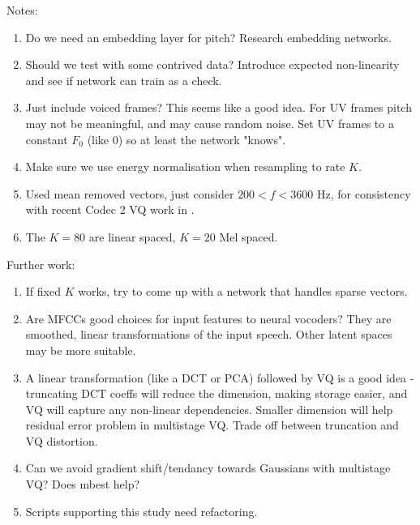 \documentclass{article}
\begin{document}
Notes:
\begin{enumerate}
\item Do we need an embedding layer for pitch?  Research embedding networks.
\item Should we test with some contrived data?  Introduce expected non-linearity and see if network can train as a check.
\item Just include voiced frames?  This seems like a good idea.  For UV frames pitch may not be meaningful, and may cause random noise. Set UV frames to a constant $F_0$ (like 0) so at least the network "knows".
\item Make sure we use energy normalisation \cite{rowe2023_ratek_study} when resampling to rate $K$.
\item Used mean removed vectors, just consider $200 < f < 3600$ Hz, for consistency with recent Codec 2 VQ work in \cite{rowe2023_ratek_study}.
\item The $K=80$ are linear spaced, $K=20$ Mel spaced.
\end{enumerate}

Further work:
\begin{enumerate}
\item If fixed $K$ works, try to come up with a network that handles sparse vectors.
\item Are MFCCs good choices for input features to neural vocoders? They are smoothed, linear transformations of the input speech.  Other latent spaces may be more suitable.
\item A linear transformation (like a DCT or PCA) followed by VQ is a good idea - truncating DCT coeffs will reduce the dimension, making storage easier, and VQ will capture any non-linear dependencies.  Smaller dimension will help residual error problem in multistage VQ. Trade off between truncation and VQ distortion.
\item Can we avoid gradient shift/tendancy towards Gaussians with multistage VQ?  Does mbest help?
\item Scripts supporting this study need refactoring.
\end{enumerate}



\end{document}
